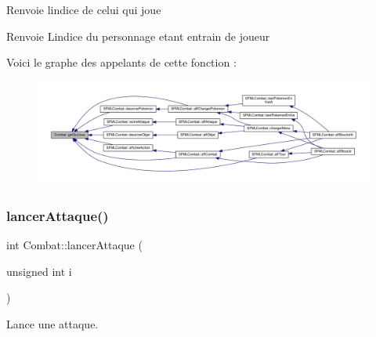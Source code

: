 Renvoie l\textquotesingle{}indice de celui qui joue \begin{DoxyReturn}{Renvoie}
L\textquotesingle{}indice du personnage etant entrain de joueur 
\end{DoxyReturn}
Voici le graphe des appelants de cette fonction \+:\nopagebreak
\begin{figure}[H]
\begin{center}
\leavevmode
\includegraphics[width=350pt]{class_combat_aed2119127fb9b7ed023dd481927c27aa_icgraph}
\end{center}
\end{figure}
\mbox{\label{class_combat_a310a968bf21791e88753ca6c6a024d8d}} 
\subsubsection{\texorpdfstring{lancer\+Attaque()}{lancerAttaque()}}
{\footnotesize\ttfamily int Combat\+::lancer\+Attaque (\begin{DoxyParamCaption}\item[{unsigned int}]{i }\end{DoxyParamCaption})}



Lance une attaque. 

